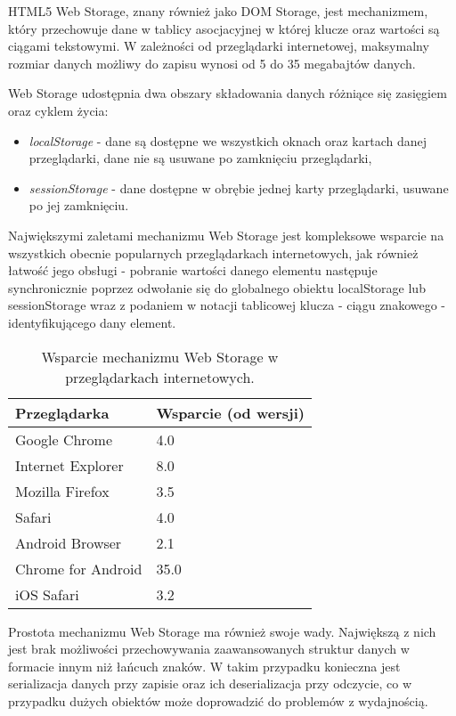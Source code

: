 HTML5 Web Storage, znany również jako DOM Storage, jest mechanizmem, który przechowuje dane w tablicy asocjacyjnej w której klucze oraz wartości są ciągami tekstowymi. W zależności od przeglądarki internetowej, maksymalny rozmiar danych możliwy do zapisu wynosi od 5 do 35 megabajtów danych.

Web Storage udostępnia dwa obszary składowania danych różniące się zasięgiem oraz cyklem życia:

\begin{itemize}
\item \emph{localStorage} - dane są dostępne we wszystkich oknach oraz kartach danej przeglądarki, dane nie są usuwane po zamknięciu przeglądarki,
\item \emph{sessionStorage} - dane dostępne w obrębie jednej karty przeglądarki, usuwane po jej zamknięciu.
\end{itemize}

Największymi zaletami mechanizmu Web Storage jest kompleksowe wsparcie na wszystkich obecnie popularnych przeglądarkach internetowych, jak również łatwość jego obsługi - pobranie wartości danego elementu następuje synchronicznie poprzez odwołanie się do globalnego obiektu localStorage lub sessionStorage wraz z podaniem w notacji tablicowej klucza - ciągu znakowego - identyfikującego dany element.

\begin{table}[h]
\centering
    \begin{tabular}{ | p{8cm} | p{6cm} | }
    \hline
    \textbf{Przeglądarka} & \textbf{Wsparcie (od wersji)} \\ \hline
	Google Chrome & 4.0
	\\ \hline
	Internet Explorer & 8.0
	\\ \hline
	Mozilla Firefox & 3.5
	\\ \hline
	Safari & 4.0
	\\ \hline
	Android Browser & 2.1
	\\ \hline
	Chrome for Android & 35.0
	\\ \hline
	iOS Safari & 3.2
	\\ \hline
    \end{tabular}
	\caption{Wsparcie mechanizmu Web Storage w przeglądarkach internetowych.}
\end{table}

Prostota mechanizmu Web Storage ma również swoje wady. Największą z nich jest brak możliwości przechowywania zaawansowanych struktur danych w formacie innym niż łańcuch znaków. W takim przypadku konieczna jest serializacja danych przy zapisie oraz ich deserializacja przy odczycie, co w przypadku dużych obiektów może doprowadzić do problemów z wydajnością.

